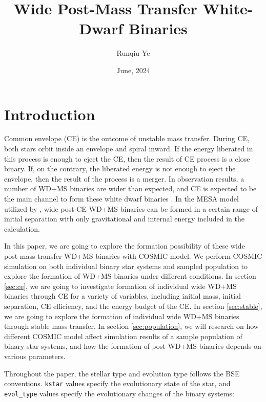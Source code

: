\documentclass[12pt]{article}
\title{Wide Post-Mass Transfer White-Dwarf Binaries}
\author{Runqiu Ye}
\date{June, 2024}
\begin{document}
\maketitle

\section{Introduction} \label{sec:intro}

Common envelope (CE) is the outcome of unstable mass transfer. During CE, both stars orbit inside an envelope and spiral inward. If the energy liberated in this process is enough to eject the CE, then the result of CE process is a close binary. If, on the contrary, the liberated energy is not enough to eject the envelope, then the result of the process is a merger. In observation results, a number of WD+MS binaries are wider than expected, and CE is expected to be the main channel to form these white dwarf binaries \cite{yamaguchi_hi, yamaguchi_lo}. In the MESA model utilized by \cite{yamaguchi_hi, yamaguchi_lo}, wide post-CE WD+MS binaries can be formed in a certain range of initial separation with only gravitational and internal energy included in the calculation. 

In this paper, we are going to explore the formation possibility of these wide post-mass transfer WD+MS binaries with COSMIC model. We perform COSMIC simulation on both individual binary star systems and sampled population to explore the formation of WD+MS binaries under different conditions. In section \ref{sec:ce}, we are going to investigate formation of individual wide WD+MS binaries through CE for a variety of variables, including initial mass, initial separation, CE efficiency, and the energy budget of the CE. In section \ref{sec:stable}, we are going to explore the formation of individual wide WD+MS binaries through stable mass transfer. In section \ref{sec:population}, we will research on how different COSMIC model affect simulation results of a sample population of binary star systems, and how the formation of post WD+MS binaries depends on various parameters.

Throughout the paper, the stellar type and evolution type follows the BSE conventions. \verb|kstar| values specify the evolutionary state of the star, and \verb|evol_type| values specify the evolutionary changes of the binary systems:
\end{document}
